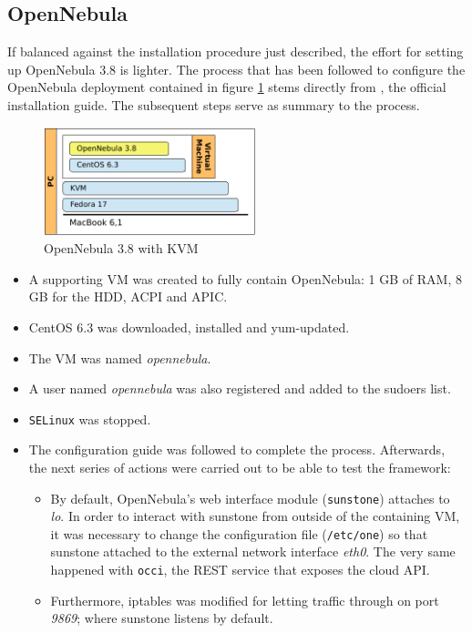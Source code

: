 \subsection{OpenNebula}\label{subsec:opennebula}

\noindent If balanced against the installation procedure just described, the effort for setting up OpenNebula 3.8 is lighter. The process that has been followed to configure the OpenNebula deployment contained in figure \ref{fig:opennebula} stems directly from \cite{centosonquickstart}, the official installation guide. The subsequent steps serve as summary to the process.

\begin{figure}[tbp]
\begin{center}
\includegraphics[width=0.55\textwidth]{imagenes/009.pdf}
 \caption{OpenNebula 3.8 with KVM}
\label{fig:opennebula}
\end{center}
\end{figure}

\begin{itemize}
 \item A supporting VM was created to fully contain OpenNebula: 1 GB of RAM, 8 GB for the HDD, ACPI and APIC.
 \item CentOS 6.3 was downloaded, installed and yum-updated.
 \item The VM was named \emph{opennebula}.
 \item A user named \emph{opennebula} was also registered and added to the sudoers list.
 \item \texttt{SELinux} was stopped.
 \item The configuration guide \cite{centosonquickstart} was followed to complete the process. Afterwards, the next series of actions were carried out to be able to test the framework:
  \begin{itemize}
   \item By default, OpenNebula's web interface module (\texttt{sunstone}) attaches to \emph{lo}. In order to interact with sunstone from outside of the containing VM, it was necessary to change the configuration file (\texttt{/etc/one}) so that sunstone attached to the external network interface \emph{eth0}. The very same happened with \texttt{occi}, the REST service that exposes the cloud API.
   \item Furthermore, iptables was modified for letting traffic through on port \emph{9869}; where sunstone listens by default.
  \end{itemize}
\end{itemize}

